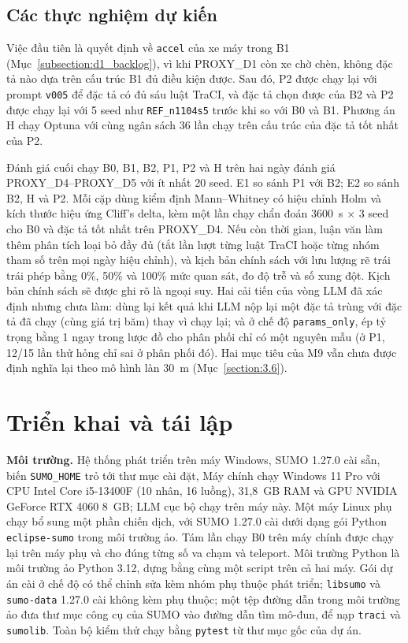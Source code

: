 \documentclass[../main.tex]{subfiles}
\begin{document}
\subsection{Các thực nghiệm dự kiến}
\label{subsection:planned_experiments}

Việc đầu tiên là quyết định về \texttt{accel} của xe máy trong B1 (Mục~\ref{subsection:d1_backlog}), vì khi PROXY\_D1 còn xe chờ chèn, không đặc tả nào dựa trên cấu trúc B1 đủ điều kiện được. Sau đó, P2 được chạy lại với prompt \texttt{v005} để đặc tả có đủ sáu luật TraCI, và đặc tả chọn được của B2 và P2 được chạy lại với 5 seed như \texttt{REF\_n1104s5} trước khi so với B0 và B1. Phương án H chạy Optuna với cùng ngân sách 36 lần chạy trên cấu trúc của đặc tả tốt nhất của P2.

Đánh giá cuối chạy B0, B1, B2, P1, P2 và H trên hai ngày đánh giá PROXY\_D4--PROXY\_D5 với ít nhất 20 seed. E1 so sánh P1 với B2; E2 so sánh B2, H và P2. Mỗi cặp dùng kiểm định Mann--Whitney có hiệu chỉnh Holm và kích thước hiệu ứng Cliff's delta, kèm một lần chạy chẩn đoán 3600~s $\times$ 3 seed cho B0 và đặc tả tốt nhất trên PROXY\_D4. Nếu còn thời gian, luận văn làm thêm phân tích loại bỏ đầy đủ (tắt lần lượt từng luật TraCI hoặc từng nhóm tham số trên mọi ngày hiệu chỉnh), và kịch bản chính sách với lưu lượng rẽ trái trái phép bằng 0\%, 50\% và 100\% mức quan sát, đo độ trễ và số xung đột. Kịch bản chính sách sẽ được ghi rõ là ngoại suy.
Hai cải tiến của vòng LLM đã xác định nhưng chưa làm: dùng lại kết quả khi LLM nộp lại một đặc tả trùng với đặc tả đã chạy (cùng giá trị băm) thay vì chạy lại; và ở chế độ \texttt{params\_only}, ép tỷ trọng bằng 1 ngay trong lược đồ cho phân phối chỉ có một nguyên mẫu (ở P1, 12/15 lần thử hỏng chỉ sai ở phân phối đó). Hai mục tiêu của M9 vẫn chưa được định nghĩa lại theo mô hình làn 30~m (Mục~\ref{section:3.6}).

\section{Triển khai và tái lập}
\label{section:deploy}

\textbf{Môi trường.} Hệ thống phát triển trên máy Windows, SUMO 1.27.0 cài sẵn, biến \texttt{SUMO\_HOME} trỏ tới thư mục cài đặt, Máy chính chạy Windows 11 Pro với CPU Intel Core i5-13400F (10 nhân, 16 luồng), 31,8~GB RAM và GPU NVIDIA GeForce RTX 4060 8~GB; LLM cục bộ chạy trên máy này. Một máy Linux phụ chạy bổ sung một phần chiến dịch, với SUMO 1.27.0 cài dưới dạng gói Python \texttt{eclipse-sumo} trong môi trường ảo. Tám lần chạy B0 trên máy chính được chạy lại trên máy phụ và cho đúng từng số va chạm và teleport. Môi trường Python là môi trường ảo Python 3.12, dựng bằng cùng một script trên cả hai máy. Gói dự án cài ở chế độ có thể chỉnh sửa kèm nhóm phụ thuộc phát triển; \texttt{libsumo} và \texttt{sumo-data} 1.27.0 cài không kèm phụ thuộc; một tệp đường dẫn trong môi trường ảo đưa thư mục công cụ của SUMO vào đường dẫn tìm mô-đun, để nạp \texttt{traci} và \texttt{sumolib}. Toàn bộ kiểm thử chạy bằng \texttt{pytest} từ thư mục gốc của dự án.
\end{document}
